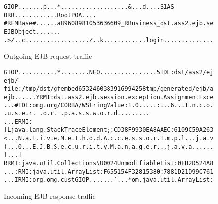 \documentclass[a4paper,10pt]{article}
\begin{document}
\begin{figure}
{\small
\begin{lstlisting}
GIOP.......p...*...................&...d....S1AS-ORB............RootPOA....
#RFMBase#......a89608981053636609_RBusiness_dst.ass2.ejb.session.interfaces._IJobManagementBean_Remote-EJBObject....... .>Z..c..................Z..k............login.......................................NEO....................#IDL:omg.org/CORBA/WStringValue:1.0.........h.a.n.s.i...................p.w.1
\end{lstlisting}
}
\caption{Outgoing EJB request traffic}
\end{figure}

\begin{figure}
{\small
\begin{lstlisting}
GIOP...........*........NEO................5IDL:dst/ass2/ejb/session/_exception/AssignmentEx:1.0............file:/tmp/dst/gfembed6532460383916994258tmp/applications/ass2-ejb/ file:/tmp/dst/gfembed6532460383916994258tmp/generated/ejb/ass2-ejb......YRMI:dst.ass2.ejb.session.exception.AssignmentException:C541A83F0F5CCDCE:566BE4E93509FD43.......................
...#IDL:omg.org/CORBA/WStringValue:1.0.....:...6...I.n.c.o.r.r.e.c.t. .u.s.e.r. .o.r. .p.a.s.s.w.o.r.d.........
...ERMI:[Ljava.lang.StackTraceElement;:CD38F9930EA8AAEC:6109C59A2636DD85...........).......BRMI:java.lang.StackTraceElement:CD38F9930EA8AAEC:6109C59A2636DD85......................N...d.s.t...a.s.s.2...e.j.b...s.e.s.s.i.o.n...J.o.b.M.a.n.a.g.e.m.e.n.t.B.e.a.n.....................J.o.b.M.a.n.a.g.e.m.e.n.t.B.e.a.n...j.a.v.a.............D.......l.o.g.i.n...............................J...s.u.n...r.e.f.l.e.c.t...N.a.t.i.v.e.M.e.t.h.o.d.A.c.c.e.s.s.o.r.I.m.p.l.................<...N.a.t.i.v.e.M.e.t.h.o.d.A.c.c.e.s.s.o.r.I.m.p.l...j.a.v.a...........p....GIOP...........*...i.n.v.o.k.e.0...............9.......$.......x...........0.......i.n.v.o.k.e.0...............+...............R...s.u.n...r.e.f.l.e.c.t...D.e.l.e.g.a.t.i.n.g.M.e.t.h.o.d.A.c.c.e.s.s.o.r.I.m.p.l94...............D...D.e.l.e.g.a.t.i.n.g.M.e.t.h.o.d.A.c.c.e.s.s.o.r.I.m.p.l...j.a.v.a.......................Y...........0...2...j.a.v.a...l.a.n.g...r.e.f.l.e.c.t...M.e.t.h.o.din...................M.e.t.h.o.d...j.a.v.a.......................................t...o.r.g...g.l.a.s.s.f.i.s.h...e.j.b...s.e.c.u.r.i.t.y...a.p.p.l.i.c.a.t.i.o.n...E.J.B.S.e.c.u.r.i.t.y.M.a.n.a.g.e.r...........(...0...E.J.B.S.e.c.u.r.i.t.y.M.a.n.a.g.e.r...j.a.v.a...................r.u.n.M.e.t.h.o.d...............d.......................p...........d...................
[...]
RRMI:java.util.Collections\U0024UnmodifiableList:0FB2D524A8F804A3:FC0F2531B5EC8E10..l...
...:RMI:java.util.ArrayList:F655154F32815380:7881D21D99C7619D..................
...IRMI:org.omg.custGIOP.......`...*om.java.util.ArrayList:F655154F32815380:7881D21D99C7619D.a.n...................L............
\end{lstlisting}
}
\caption{Incoming EJB response traffic}
\end{figure}
\end{document}
